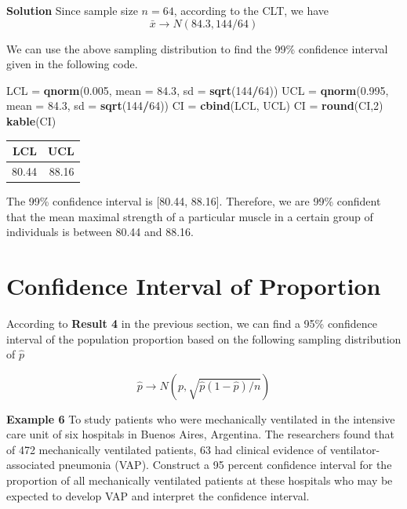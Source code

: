 \documentclass[
]{book}
\newenvironment{Shaded}{\begin{snugshade}}{\end{snugshade}}
\newcommand{\AttributeTok}[1]{\textcolor[rgb]{0.13,0.29,0.53}{#1}}
\newcommand{\DecValTok}[1]{\textcolor[rgb]{0.00,0.00,0.81}{#1}}
\newcommand{\FloatTok}[1]{\textcolor[rgb]{0.00,0.00,0.81}{#1}}
\newcommand{\FunctionTok}[1]{\textcolor[rgb]{0.13,0.29,0.53}{\textbf{#1}}}
\newcommand{\NormalTok}[1]{#1}
\newcommand{\OtherTok}[1]{\textcolor[rgb]{0.56,0.35,0.01}{#1}}
\newcommand{\SpecialCharTok}[1]{\textcolor[rgb]{0.81,0.36,0.00}{\textbf{#1}}}
\begin{document}
\textbf{Solution} Since sample size \(n = 64\), according to the CLT, we have
\[
\bar{x} \to N(84.3, 144/64)
\]

We can use the above sampling distribution to find the 99\% confidence interval given in the following code.

\begin{Shaded}
\begin{Highlighting}[]
\NormalTok{LCL }\OtherTok{=} \FunctionTok{qnorm}\NormalTok{(}\FloatTok{0.005}\NormalTok{, }\AttributeTok{mean =} \FloatTok{84.3}\NormalTok{, }\AttributeTok{sd =} \FunctionTok{sqrt}\NormalTok{(}\DecValTok{144}\SpecialCharTok{/}\DecValTok{64}\NormalTok{))}
\NormalTok{UCL }\OtherTok{=} \FunctionTok{qnorm}\NormalTok{(}\FloatTok{0.995}\NormalTok{, }\AttributeTok{mean =} \FloatTok{84.3}\NormalTok{, }\AttributeTok{sd =} \FunctionTok{sqrt}\NormalTok{(}\DecValTok{144}\SpecialCharTok{/}\DecValTok{64}\NormalTok{))}
\NormalTok{CI }\OtherTok{=} \FunctionTok{cbind}\NormalTok{(LCL, UCL)}
\NormalTok{CI }\OtherTok{=} \FunctionTok{round}\NormalTok{(CI,}\DecValTok{2}\NormalTok{)}
\FunctionTok{kable}\NormalTok{(CI)}
\end{Highlighting}
\end{Shaded}

\begin{tabular}{r|r}
\hline
LCL & UCL\\
\hline
80.44 & 88.16\\
\hline
\end{tabular}

The 99\% confidence interval is {[}80.44, 88.16{]}. Therefore, we are 99\% confident that the mean maximal strength of a particular muscle in a certain group of individuals is between 80.44 and 88.16.

\hypertarget{confidence-interval-of-proportion}{%
\section{Confidence Interval of Proportion}\label{confidence-interval-of-proportion}}

According to \textbf{Result 4} in the previous section, we can find a 95\% confidence interval of the population proportion based on the following sampling distribution of \(\hat{p}\)

\[
\hat{p} \to N(p, \sqrt{\hat{p}(1-\hat{p})/n})
\]

\textbf{Example 6} To study patients who were mechanically ventilated in the intensive care unit of six hospitals in Buenos Aires, Argentina. The researchers found that of 472 mechanically ventilated patients, 63 had clinical evidence of ventilator-associated pneumonia (VAP). Construct a 95 percent confidence interval for the proportion of all mechanically ventilated patients at these hospitals who may be expected to develop VAP and interpret the confidence interval.
\end{document}
